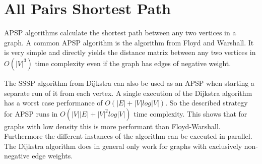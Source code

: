 \section{All Pairs Shortest Path} \label{sec:shortest_path}
\Gls{APSP} algorithms calculate the shortest path between any two vertices in a graph. A common \acrshort{APSP} algorithm is the algorithm from Floyd and Warshall. It is very simple and directly yields the distance matrix between any two vertices in $O(|V|^3)$ time complexity even if the graph has edges of negative weight.

The \gls{SSSP} algorithm from Dijkstra can also be used as an \acrshort{APSP} when starting a separate run of it from each vertex. A single execution of the Dijkstra algorithm has a worst case performance of $O(|E|+|V|log|V|)$. So the described strategy for \acrshort{APSP} runs in $O(|V||E| + |V|^2 log|V|)$ time complexity. This shows that for graphs with low density this is more performant than Floyd-Warshall. Furthermore the different instances of the algorithm can be executed in parallel. The Dijkstra algorithm does in general only work for graphs with exclusively non-negative edge weights.

